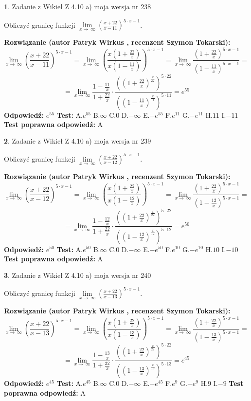 \documentclass[12pt, a4paper]{article}
\theoremstyle{definition} %
\newtheorem{zad}{}
\newcommand{\zadStart}[1]{\begin{zad}#1\newline}
\newcommand{\zadStop}{\end{zad}}
\newcommand{\rozwStart}[2]{\noindent \textbf{Rozwiązanie (autor #1 , recenzent #2): }\newline}
\newcommand{\rozwStop}{\newline}
\newcommand{\odpStart}{\noindent \textbf{Odpowiedź:}\newline}
\newcommand{\odpStop}{\newline}
\newcommand{\testStart}{\noindent \textbf{Test:}\newline}
\newcommand{\testStop}{\newline}
\newcommand{\kluczStart}{\noindent \textbf{Test poprawna odpowiedź:}\newline}
\newcommand{\kluczStop}{\newline}
\begin{document}
\zadStart{Zadanie z Wikieł Z 4.10 a) moja wersja nr 238}

Obliczyć granicę funkcji  $\lim\limits_{x\to\ \infty}(\frac{x+22}{x-11})^{5\cdot x-1}$.
\zadStop
\rozwStart{Patryk Wirkus}{Szymon Tokarski}
$$\lim\limits_{x\to\ \infty}(\frac{x+22}{x-11})^{5\cdot x-1} = \lim\limits_{x\to\ \infty}(\frac{x(1+\frac{22}{x})}{x(1-\frac{11}{x})})^{5\cdot x-1}=\lim\limits_{x\to\ \infty}\frac{(1+\frac{22}{x})^{5\cdot x-1}}{(1-\frac{11}{x})^{5\cdot x-1}}=$$
$$=\lim\limits_{x\to\ \infty}\frac{1-\frac{11}{x}}{1+\frac{22}{x}}\cdot\frac{((1+\frac{22}{x})^{\frac{x}{22}})^{5\cdot22}}{((1-\frac{11}{x})^{\frac{x}{11}})^{5\cdot11}}=e^{55}$$
\rozwStop
\odpStart
$e^{55}$
\odpStop
\testStart
A.$e^{55}$ B.$\infty$ C.$0$ D.$-\infty$ E.$-e^{55}$
F.$e^{11}$ G.$-e^{11}$
H.$11$
I.$-11$
\testStop
\kluczStart
A
\kluczStop



\zadStart{Zadanie z Wikieł Z 4.10 a) moja wersja nr 239}

Obliczyć granicę funkcji  $\lim\limits_{x\to\ \infty}(\frac{x+22}{x-12})^{5\cdot x-1}$.
\zadStop
\rozwStart{Patryk Wirkus}{Szymon Tokarski}
$$\lim\limits_{x\to\ \infty}(\frac{x+22}{x-12})^{5\cdot x-1} = \lim\limits_{x\to\ \infty}(\frac{x(1+\frac{22}{x})}{x(1-\frac{12}{x})})^{5\cdot x-1}=\lim\limits_{x\to\ \infty}\frac{(1+\frac{22}{x})^{5\cdot x-1}}{(1-\frac{12}{x})^{5\cdot x-1}}=$$
$$=\lim\limits_{x\to\ \infty}\frac{1-\frac{12}{x}}{1+\frac{22}{x}}\cdot\frac{((1+\frac{22}{x})^{\frac{x}{22}})^{5\cdot22}}{((1-\frac{12}{x})^{\frac{x}{12}})^{5\cdot12}}=e^{50}$$
\rozwStop
\odpStart
$e^{50}$
\odpStop
\testStart
A.$e^{50}$ B.$\infty$ C.$0$ D.$-\infty$ E.$-e^{50}$
F.$e^{10}$ G.$-e^{10}$
H.$10$
I.$-10$
\testStop
\kluczStart
A
\kluczStop



\zadStart{Zadanie z Wikieł Z 4.10 a) moja wersja nr 240}

Obliczyć granicę funkcji  $\lim\limits_{x\to\ \infty}(\frac{x+22}{x-13})^{5\cdot x-1}$.
\zadStop
\rozwStart{Patryk Wirkus}{Szymon Tokarski}
$$\lim\limits_{x\to\ \infty}(\frac{x+22}{x-13})^{5\cdot x-1} = \lim\limits_{x\to\ \infty}(\frac{x(1+\frac{22}{x})}{x(1-\frac{13}{x})})^{5\cdot x-1}=\lim\limits_{x\to\ \infty}\frac{(1+\frac{22}{x})^{5\cdot x-1}}{(1-\frac{13}{x})^{5\cdot x-1}}=$$
$$=\lim\limits_{x\to\ \infty}\frac{1-\frac{13}{x}}{1+\frac{22}{x}}\cdot\frac{((1+\frac{22}{x})^{\frac{x}{22}})^{5\cdot22}}{((1-\frac{13}{x})^{\frac{x}{13}})^{5\cdot13}}=e^{45}$$
\rozwStop
\odpStart
$e^{45}$
\odpStop
\testStart
A.$e^{45}$ B.$\infty$ C.$0$ D.$-\infty$ E.$-e^{45}$
F.$e^{9}$ G.$-e^{9}$
H.$9$
I.$-9$
\testStop
\kluczStart
A
\kluczStop
\end{document}

